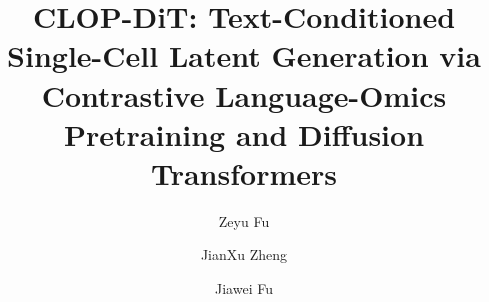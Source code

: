 \documentclass[preprint,review,12pt]{elsarticle}
\begin{document}
\begin{frontmatter}

\title{CLOP-DiT: Text-Conditioned Single-Cell Latent Generation via Contrastive Language-Omics Pretraining and Diffusion Transformers}

\author[ammu]{Zeyu Fu}
\author[swh]{JianXu Zheng}
\author[xqh]{Jiawei Fu}


\address[ammu]{State Key Laboratory of Trauma and Chemical Poisoning, Institute of Combined Injury, Chongqing Engineering Research Center for Nanomedicine, College of Preventive Medicine, Army Medical University, Chongqing 400038, China}
\address[swh]{Chongqing Key Laboratory of Intelligent Diagnosis, Treatment and Rehabilitation of Central Nervous System Injuries, Southwest Hospital, Third Military Medical University (Army Medical University), Chongqing 400038, China}
\address[xqh]{Department of Orthopedics, Xinqiao Hospital, Army Medical University, Chongqing 400037, China}


\end{frontmatter}
\end{document}
